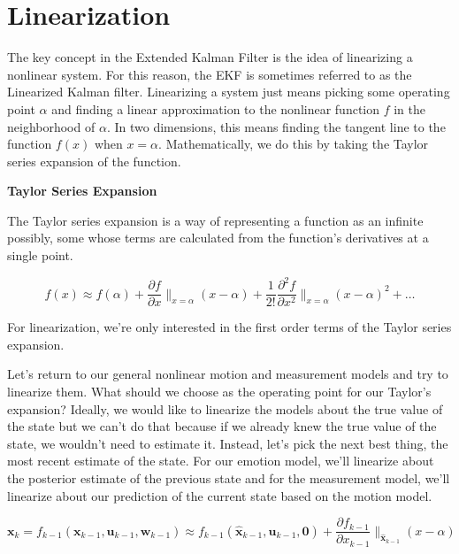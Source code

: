 \section{Linearization}

The key concept in the Extended Kalman Filter is the idea of linearizing
a nonlinear system. For this reason, the EKF is sometimes referred to as the
Linearized Kalman filter. Linearizing a system just means
picking some operating point $\alpha$ and finding a linear approximation to the nonlinear function $f$ in
the neighborhood of $\alpha$. In two dimensions, this means
finding the tangent line to the function $f(x)$ when $x = \alpha$. Mathematically, we do this by taking the Taylor series expansion
of the function. 



\begin{framed}
\theoremstyle{remark}
\begin{remark}{\textbf{Taylor Series Expansion}}

The Taylor series expansion is a way of representing a function
as an infinite possibly, some whose terms are calculated from the function's derivatives
at a single point.


\begin{equation}
f(x) \approx f(\alpha) + \frac{\partial f}{\partial x} \|_{x=\alpha} (x-\alpha) + \frac{1}{2!}\frac{\partial^2 f}{\partial x^2} \|_{x=\alpha} (x-\alpha)^2 + \ldots
\end{equation}

\end{remark}
\end{framed}

For linearization, we're only interested in the first order terms of the Taylor
series expansion. 

Let's return to our general nonlinear motion and measurement models and
try to linearize them. What should we choose as the operating
point for our Taylor's expansion? Ideally, we would like to linearize
the models about the true value of the state but we can't do that because if we already knew
the true value of the state, we wouldn't need to estimate it. Instead, let's pick
the next best thing, the most recent estimate of the state. For our emotion model, we'll linearize about
the posterior estimate of the previous state and
for the measurement model, we'll linearize about our prediction of the current state based
on the motion model.




\begin{equation}
\mathbf{x}_k = f_{k-1}(\mathbf{x}_{k-1}, \mathbf{u}_{k-1}, \mathbf{w}_{k-1}) \approx f_{k-1}(\hat{\mathbf{x}}_{k-1}, \mathbf{u}_{k-1}, \mathbf{0}) + \frac{\partial f_{k-1}}{\partial x_{k-1}} \|_{\hat{\mathbf{x}}_{k-1}} (x-\alpha)
\end{equation}


